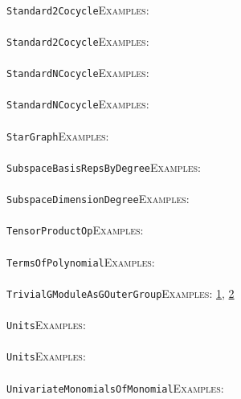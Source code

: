 \documentclass[a4paper,11pt]{report}
\begin{document}
{{ \\
 \texttt{Standard2Cocycle}{\nobreakspace}{\nobreakspace}{\nobreakspace}{\nobreakspace}\textsc{Examples:} \\
 \\
 \texttt{Standard2Cocycle}{\nobreakspace}{\nobreakspace}{\nobreakspace}{\nobreakspace}\textsc{Examples:} \\
 \\
 \texttt{StandardNCocycle}{\nobreakspace}{\nobreakspace}{\nobreakspace}{\nobreakspace}\textsc{Examples:} \\
 \\
 \texttt{StandardNCocycle}{\nobreakspace}{\nobreakspace}{\nobreakspace}{\nobreakspace}\textsc{Examples:} \\
 \\
 \texttt{StarGraph}{\nobreakspace}{\nobreakspace}{\nobreakspace}{\nobreakspace}\textsc{Examples:} \\
 \\
 \texttt{SubspaceBasisRepsByDegree}{\nobreakspace}{\nobreakspace}{\nobreakspace}{\nobreakspace}\textsc{Examples:} \\
 \\
 \texttt{SubspaceDimensionDegree}{\nobreakspace}{\nobreakspace}{\nobreakspace}{\nobreakspace}\textsc{Examples:} \\
 \\
 \texttt{TensorProductOp}{\nobreakspace}{\nobreakspace}{\nobreakspace}{\nobreakspace}\textsc{Examples:} \\
 \\
 \texttt{TermsOfPolynomial}{\nobreakspace}{\nobreakspace}{\nobreakspace}{\nobreakspace}\textsc{Examples:} \\
 \\
 \texttt{TrivialGModuleAsGOuterGroup}{\nobreakspace}{\nobreakspace}{\nobreakspace}{\nobreakspace}\textsc{Examples:} \href{../www/SideLinks/About/aboutCoefficientSequence.html} {1}{\nobreakspace}, \href{../www/SideLinks/About/aboutGouter.html} {2}{\nobreakspace} \\
 \\
 \texttt{Units}{\nobreakspace}{\nobreakspace}{\nobreakspace}{\nobreakspace}\textsc{Examples:} \\
 \\
 \texttt{Units}{\nobreakspace}{\nobreakspace}{\nobreakspace}{\nobreakspace}\textsc{Examples:} \\
 \\
 \texttt{UnivariateMonomialsOfMonomial}{\nobreakspace}{\nobreakspace}{\nobreakspace}{\nobreakspace}\textsc{Examples:} \\
}}
\end{document}
